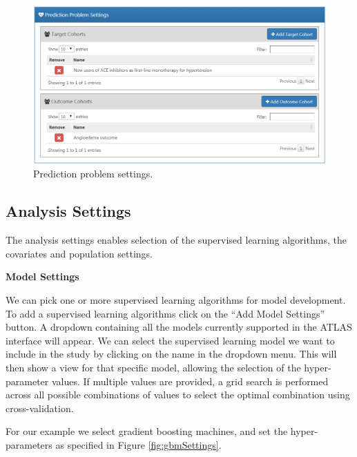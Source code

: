 \documentclass[11pt]{book}
\theoremstyle{definition}
\theoremstyle{definition}
\theoremstyle{definition}
\theoremstyle{remark}
\begin{document}
\begin{figure}

{\centering \includegraphics[width=1\linewidth]{images/PatientLevelPrediction/problemSettings} 

}

\caption{Prediction problem settings.}\label{fig:problemSettings}
\end{figure}

\hypertarget{analysis-settings}{%
\subsection{Analysis Settings}\label{analysis-settings}}

The analysis settings enables selection of the supervised learning algorithms, the covariates and population settings.

\textbf{Model Settings}

We can pick one or more supervised learning algorithms for model development. To add a supervised learning algorithms click on the ``Add Model Settings'' button. A dropdown containing all the models currently supported in the ATLAS interface will appear. We can select the supervised learning model we want to include in the study by clicking on the name in the dropdown menu. This will then show a view for that specific model, allowing the selection of the hyper-parameter values. If multiple values are provided, a grid search is performed across all possible combinations of values to select the optimal combination using cross-validation.

For our example we select gradient boosting machines, and set the hyper-parameters as specified in Figure \ref{fig:gbmSettings}.
\end{document}
